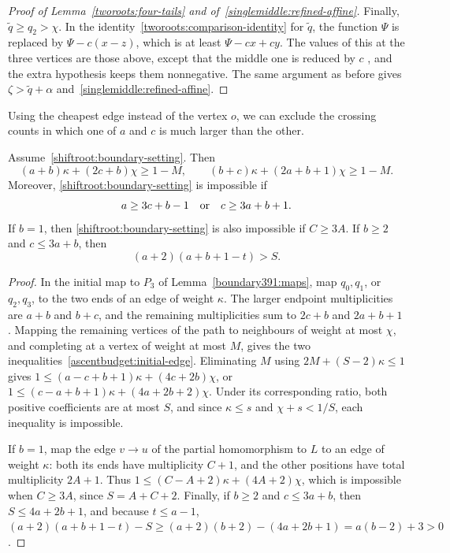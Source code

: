 \begin{proof}[Proof of Lemma~\ref{tworoots:four-tails} and of~\eqref{singlemiddle:refined-affine}]
Finally, $\widetilde q\ge q_2>\chi$. In the identity~\eqref{tworoots:comparison-identity} for $\widetilde q$, the function $\Psi$ is replaced by $\Psi-c(x-z)$, which is at least
$\Psi-cx+cy$. The values of this at the three vertices
are those above, except that the middle one is reduced
by $c$ , and the extra hypothesis keeps them nonnegative. The same argument as before
gives $\zeta>\widetilde q+\alpha$ and~\eqref{singlemiddle:refined-affine}.
\end{proof}

Using the cheapest edge instead of the vertex $o$, we can exclude the crossing counts in which one of $a$ and $c$ is much larger than the other.

\begin{lemma}
\label{ascentbudget:leaf}
Assume~\eqref{shiftroot:boundary-setting}. Then
\begin{equation}\label{ascentbudget:initial-edge}
 (a+b)\kappa+(2c+b)\chi\ge1-M,\qquad
 (b+c)\kappa+(2a+b+1)\chi\ge1-M.
\end{equation}
Moreover, \eqref{shiftroot:boundary-setting} is impossible if
\begin{equation}\label{ascentbudget:ratios}
 a\ge3c+b-1\quad\hbox{or}\quad c\ge3a+b+1.
\end{equation}
If $b=1$, then \eqref{shiftroot:boundary-setting} is also impossible if $C\ge3A$.
If $b\ge2$ and $c\le 3a+b$, then
\begin{equation}\label{ascentbudget:automatic-comparisons}
 (a+2)(a+b+1-t)>S.
\end{equation}
\end{lemma}
\begin{proof}
In the initial map to $P_3$ of Lemma~\ref{boundary391:maps},
map $q_0,q_1$, or $q_2,q_3$, to the two ends of an edge of weight $\kappa$.
The larger endpoint multiplicities are $a+b$ and $b+c$, and the
remaining multiplicities sum to $2c+b$ and $2a+b+1$.
Mapping the remaining vertices of the path to neighbours of weight at most $\chi$, and completing at a vertex of weight at most $M$, gives the two inequalities~\eqref{ascentbudget:initial-edge}.
Eliminating $M$ using $2M+(S-2)\kappa\le1$ gives $1\le(a-c+b+1)\kappa+(4c+2b)\chi$, or $1\le(c-a+b+1)\kappa+(4a+2b+2)\chi$. Under its corresponding ratio, both positive coefficients are
at most $S$, and since $\kappa\le s$ and $\chi+s<1/S$, each
inequality is impossible.

If $b=1$, map the edge $v\to u$ of the partial homomorphism to $L$ to an edge of weight $\kappa$: both its ends have multiplicity $C+1$, and the other positions have total multiplicity $2A+1$.
Thus $1\le(C-A+2)\kappa+(4A+2)\chi$, which is impossible when
$C\ge3A$, since $S=A+C+2$.
Finally, if $b\ge2$ and $c\le3a+b$, then $S\le4a+2b+1$,
and because $t\le a-1$, $(a+2)(a+b+1-t)-S\ge(a+2)(b+2)-(4a+2b+1) =a(b-2)+3>0$ . \end{proof}


